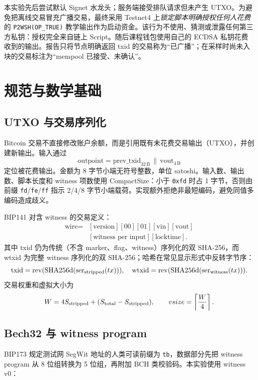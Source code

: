\documentclass[UTF8,a4paper,zihao=-4]{ctexart}
\begin{document}
本实验先后尝试默认 Signet 水龙头；服务端接受排队请求但未产生 UTXO。为避免把离线交易冒充广播交易，最终采用 Testnet4 上\emph{锁定脚本明确授权任何人花费}的 \texttt{P2WSH}\allowbreak\texttt{(OP\_TRUE)} 教学输出作为启动资金。该行为不使用、猜测或泄露任何第三方私钥：授权完全来自链上 Script。随后课程钱包使用自己的 ECDSA 私钥花费收到的输出。报告只将节点明确返回 txid 的交易称为“已广播”；在采样时尚未入块的交易标注为“mempool 已接受、未确认”。

\section{规范与数学基础}

\subsection{UTXO 与交易序列化}

Bitcoin 交易不直接修改账户余额，而是引用既有未花费交易输出（UTXO），并创建新输出。输入通过
\[
  \text{outpoint}=\text{prev\_txid}_{32\,\mathrm{B}}\,\|\,\text{vout}_{4\,\mathrm{B}}
\]
定位被花费输出。金额为 8 字节小端无符号整数，单位 satoshi。输入数、输出数、脚本长度和 witness 项数使用 CompactSize：小于 \texttt{0xfd} 时占 1 字节，否则由前缀 \texttt{fd}/\texttt{fe}/\texttt{ff} 指示 2/4/8 字节小端载荷。实现额外拒绝非最短编码，避免同值多编码造成歧义。

BIP141 对含 witness 的交易定义\cite{bip141}：
\[
\begin{aligned}
\text{wire}={}&[\text{version}][00][01][\text{vin}][\text{vout}]\\
               & [\text{witness per input}][\text{locktime}].
\end{aligned}
\]
其中 txid 仍为传统（不含 marker、flag、witness）序列化的双 SHA-256，而 wtxid 为完整 witness 序列化的双 SHA-256；哈希在常见显示形式中反转字节序：
\[
\mathrm{txid}=\operatorname{rev}(\mathrm{SHA256d}(\mathrm{ser}_{\rm stripped}(tx))),\quad
\mathrm{wtxid}=\operatorname{rev}(\mathrm{SHA256d}(\mathrm{ser}_{\rm witness}(tx))).
\]
交易权重和虚拟大小为
\[
W=4S_{\rm stripped}+(S_{\rm total}-S_{\rm stripped}),\qquad
vsize=\left\lceil\frac{W}{4}\right\rceil .
\]

\subsection{Bech32 与 witness program}

BIP173 规定测试网 SegWit 地址的人类可读前缀为 \texttt{tb}，数据部分先把 witness program 从 8 位组转换为 5 位组，再附加 BCH 类校验码\cite{bip173}。本实验使用 witness v0：
\end{document}
